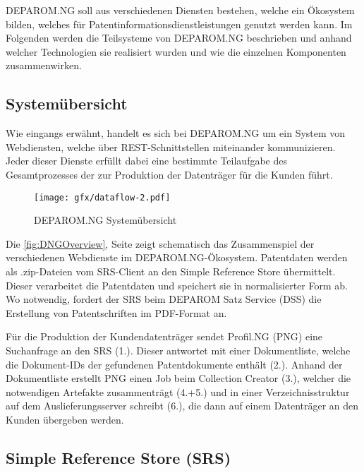 DEPAROM.NG soll aus verschiedenen Diensten bestehen, welche ein Ökosystem
bilden, welches für Patentinformationsdienstleistungen genutzt werden kann. Im
Folgenden werden die Teilsysteme von DEPAROM.NG  beschrieben und anhand welcher
Technologien sie realisiert wurden und wie die einzelnen Komponenten
zusammenwirken.

\subsection{Systemübersicht}
\label{ch:fachlichesUmfeld:Teilsysteme:Uebersicht}

Wie eingangs erwähnt, handelt es sich bei DEPAROM.NG um ein System von
Webdiensten, welche  über REST-Schnittstellen miteinander kommunizieren. Jeder
dieser Dienste erfüllt dabei eine bestimmte Teilaufgabe des Gesamtprozesses der
zur Produktion der Datenträger für die Kunden führt.

\begin{figure}[h]
  \texttt{[image: gfx/dataflow-2.pdf]}
  \caption{DEPAROM.NG Systemübersicht}
  \label{fig:DNGOverview}
\end{figure}

Die \autoref{fig:DNGOverview}, Seite \pageref{fig:DNGOverview} zeigt schematisch
das Zusammenspiel der verschiedenen Webdienste im DEPAROM.NG-Ökosystem.
Patentdaten werden als .zip-Dateien vom SRS-Client an den Simple Reference Store
übermittelt. Dieser verarbeitet die Patentdaten und speichert sie in
normalisierter Form ab. Wo notwendig, fordert der SRS beim DEPAROM Satz Service
(DSS) die Erstellung von Patentschriften im PDF-Format an.

Für die Produktion der Kundendatenträger sendet Profil.NG (PNG) eine Suchanfrage
an den SRS (1.). Dieser antwortet mit einer Dokumentliste, welche die
Dokument-IDs der gefundenen Patentdokumente enthält (2.). Anhand der
Dokumentliste erstellt PNG einen Job beim Collection Creator (3.), welcher die
notwendigen Artefakte zusammenträgt (4.+5.) und in einer Verzeichnisstruktur auf
dem Auslieferungsserver schreibt (6.), die dann auf einem Datenträger an den
Kunden übergeben werden.

\subsection{Simple Reference Store (SRS)}
\label{ch:fachlichesUmfeld:Teilsysteme:SRS}

